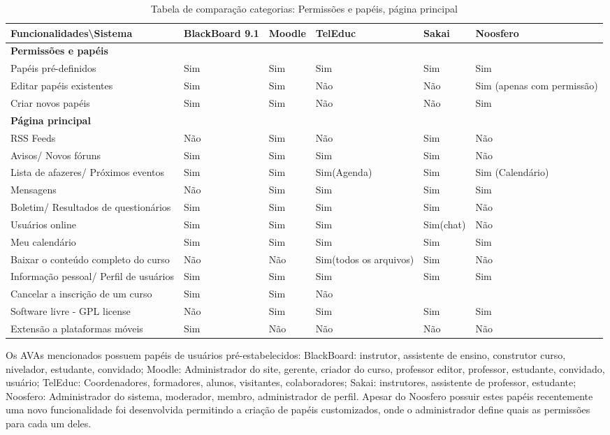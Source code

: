 \begin{table}[h]
\begin{tabular}{@{}p{5cm}|p{3.5cm}|p{3.5cm}|p{2.5cm}|p{2.5cm}|p{3.5cm}@{}}
\toprule
\textbf{Funcionalidades\textbackslash Sistema} & \textbf{BlackBoard 9.1} & \textbf{Moodle} & \textbf{TelEduc} & \textbf{Sakai} & \textbf{Noosfero}\\ \midrule
\textbf{Permissões e papéis} &  &  &  &  &  \\
Papéis pré-definidos & Sim & Sim & Sim & Sim & Sim \\
Editar papéis existentes & Sim & Sim & Não & Não & Sim (apenas com permissão) \\
Criar novos papéis & Sim & Sim & Não & Não & Sim \\
\textbf{Página principal} &  &  &  &  &  \\
RSS Feeds & Não & Sim & Não & Sim & Não \\
Avisos/ Novos fóruns & Sim & Sim & Sim & Sim & Não \\
Lista de afazeres/ Próximos eventos & Sim & Sim & Sim(Agenda) & Sim & Sim (Calendário) \\
Mensagens & Não & Sim & Sim & Sim & Sim \\
Boletim/ Resultados de questionários & Sim & Sim & Sim & Sim & Não \\
Usuários online & Sim & Sim & Sim & Sim(chat) & Não \\
Meu calendário & Sim & Sim & Sim & Sim & Sim \\
Baixar o conteúdo completo do curso & Não & Não & Sim(todos os arquivos) & Sim & Não \\
Informação pessoal/ Perfil de usuários & Sim & Sim & Sim & Sim & Sim \\
Cancelar a inscrição de um curso & Sim & Sim & Não &  &  \\
Software livre - GPL license & Não & Sim & Sim & Sim & Sim \\
Extensão a plataformas móveis & Sim & Não & Não & Não & Não
\end{tabular}
\caption{Tabela de comparação categorias: Permissões e papéis, página principal}
\label{tab:ferramentea-teste}
\end{table}

Os AVAs mencionados possuem papéis de usuários pré-estabelecidos: BlackBoard: instrutor, assistente de ensino, construtor curso, nivelador, estudante, convidado; Moodle: Administrador do site, gerente, criador do curso, professor editor, professor, estudante, convidado, usuário; TelEduc: Coordenadores, formadores, alunos, visitantes, colaboradores; Sakai: instrutores, assistente de professor, estudante; Noosfero: Administrador do sistema, moderador, membro, administrador de perfil. Apesar do Noosfero possuir estes papéis recentemente uma novo funcionalidade foi desenvolvida permitindo a criação de papéis customizados, onde o administrador define quais as permissões para cada um deles.

